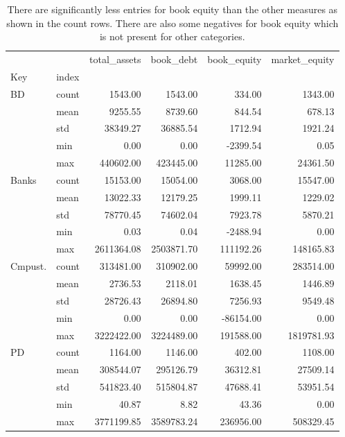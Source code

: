 \begin{table}
\caption{There are significantly less entries for book equity than the other measures as shown in the count rows. There are also some negatives for book equity which is not present for other categories. }
\label{tab:Table 2.1}
\begin{tabular}{llrrrr}
\toprule
 &  & total_assets & book_debt & book_equity & market_equity \\
Key & index &  &  &  &  \\
\midrule
{BD} & count & 1543.00 & 1543.00 & 334.00 & 1343.00 \\
 & mean & 9255.55 & 8739.60 & 844.54 & 678.13 \\
 & std & 38349.27 & 36885.54 & 1712.94 & 1921.24 \\
 & min & 0.00 & 0.00 & -2399.54 & 0.05 \\
 & max & 440602.00 & 423445.00 & 11285.00 & 24361.50 \\
\cline{1-6}
{Banks} & count & 15153.00 & 15054.00 & 3068.00 & 15547.00 \\
 & mean & 13022.33 & 12179.25 & 1999.11 & 1229.02 \\
 & std & 78770.45 & 74602.04 & 7923.78 & 5870.21 \\
 & min & 0.03 & 0.04 & -2488.94 & 0.00 \\
 & max & 2611364.08 & 2503871.70 & 111192.26 & 148165.83 \\
\cline{1-6}
{Cmpust.} & count & 313481.00 & 310902.00 & 59992.00 & 283514.00 \\
 & mean & 2736.53 & 2118.01 & 1638.45 & 1446.89 \\
 & std & 28726.43 & 26894.80 & 7256.93 & 9549.48 \\
 & min & 0.00 & 0.00 & -86154.00 & 0.00 \\
 & max & 3222422.00 & 3224489.00 & 191588.00 & 1819781.93 \\
\cline{1-6}
{PD} & count & 1164.00 & 1146.00 & 402.00 & 1108.00 \\
 & mean & 308544.07 & 295126.79 & 36312.81 & 27509.14 \\
 & std & 541823.40 & 515804.87 & 47688.41 & 53951.54 \\
 & min & 40.87 & 8.82 & 43.36 & 0.00 \\
 & max & 3771199.85 & 3589783.24 & 236956.00 & 508329.45 \\
\cline{1-6}
\bottomrule
\end{tabular}
\end{table}
